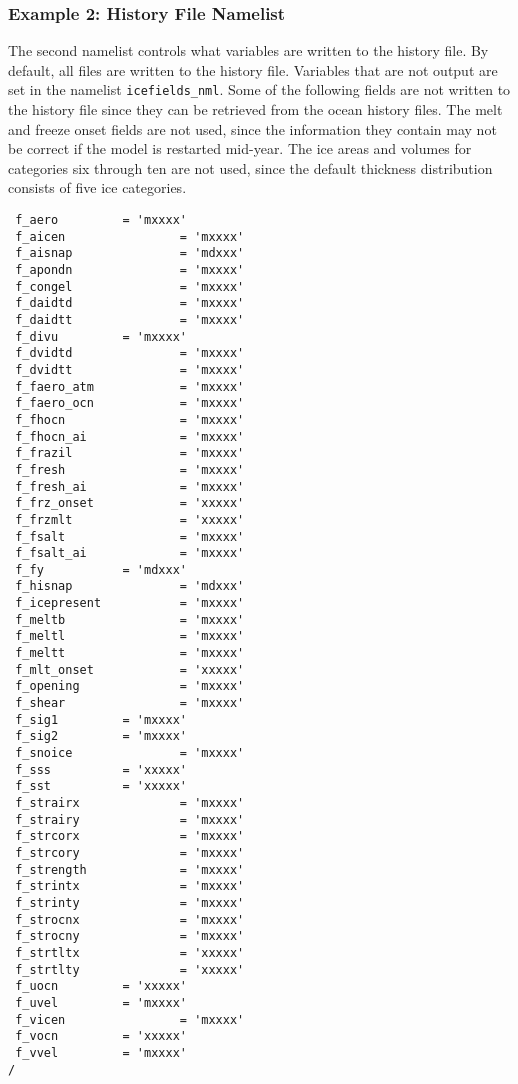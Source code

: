 \subsubsection {Example 2: History File Namelist}
\label{example2_nml}

The second namelist controls what variables are written to the history file.
By default, all files are written to the history file.  Variables that
are not output are set in the namelist {\tt icefields\_nml}.
Some of the following fields are not written to the history file since
they can be retrieved from the ocean history files.  The melt and freeze
onset fields are not used, since the information they contain may not
be correct if the model is restarted mid-year.  The ice areas and volumes
for categories six through ten are not used, since the default thickness
distribution consists of five ice categories.

\begin{verbatim}
 f_aero         = 'mxxxx' 
 f_aicen                = 'mxxxx' 
 f_aisnap               = 'mdxxx'
 f_apondn               = 'mxxxx' 
 f_congel               = 'mxxxx' 
 f_daidtd               = 'mxxxx' 
 f_daidtt               = 'mxxxx' 
 f_divu         = 'mxxxx' 
 f_dvidtd               = 'mxxxx' 
 f_dvidtt               = 'mxxxx' 
 f_faero_atm            = 'mxxxx' 
 f_faero_ocn            = 'mxxxx' 
 f_fhocn                = 'mxxxx' 
 f_fhocn_ai             = 'mxxxx' 
 f_frazil               = 'mxxxx' 
 f_fresh                = 'mxxxx' 
 f_fresh_ai             = 'mxxxx' 
 f_frz_onset            = 'xxxxx'
 f_frzmlt               = 'xxxxx'
 f_fsalt                = 'mxxxx' 
 f_fsalt_ai             = 'mxxxx' 
 f_fy           = 'mdxxx'
 f_hisnap               = 'mdxxx'
 f_icepresent           = 'mxxxx'
 f_meltb                = 'mxxxx' 
 f_meltl                = 'mxxxx' 
 f_meltt                = 'mxxxx' 
 f_mlt_onset            = 'xxxxx'
 f_opening              = 'mxxxx' 
 f_shear                = 'mxxxx' 
 f_sig1         = 'mxxxx' 
 f_sig2         = 'mxxxx' 
 f_snoice               = 'mxxxx' 
 f_sss          = 'xxxxx'
 f_sst          = 'xxxxx'
 f_strairx              = 'mxxxx' 
 f_strairy              = 'mxxxx' 
 f_strcorx              = 'mxxxx' 
 f_strcory              = 'mxxxx' 
 f_strength             = 'mxxxx' 
 f_strintx              = 'mxxxx' 
 f_strinty              = 'mxxxx' 
 f_strocnx              = 'mxxxx' 
 f_strocny              = 'mxxxx' 
 f_strtltx              = 'xxxxx'
 f_strtlty              = 'xxxxx'
 f_uocn         = 'xxxxx'
 f_uvel         = 'mxxxx' 
 f_vicen                = 'mxxxx' 
 f_vocn         = 'xxxxx'
 f_vvel         = 'mxxxx' 
/
\end{verbatim}
